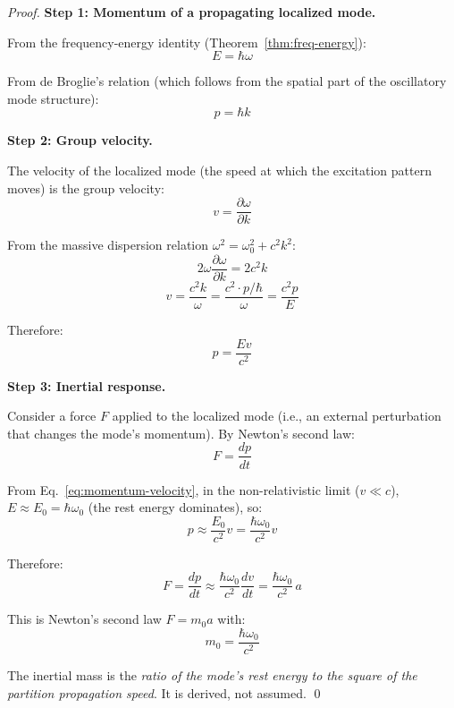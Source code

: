 \begin{proof}
\textbf{Step 1: Momentum of a propagating localized mode.}

From the frequency-energy identity (Theorem~\ref{thm:freq-energy}):
\begin{equation}
    E = \hbar\omega
\end{equation}

From de Broglie's relation (which follows from the spatial part of the oscillatory mode structure):
\begin{equation}
    p = \hbar k
\end{equation}

\textbf{Step 2: Group velocity.}

The velocity of the localized mode (the speed at which the excitation pattern moves) is the group velocity:
\begin{equation}
    v = \frac{\partial \omega}{\partial k}
\end{equation}

From the massive dispersion relation $\omega^2 = \omega_0^2 + c^2 k^2$:
\begin{equation}
    2\omega \frac{\partial \omega}{\partial k} = 2c^2 k
\end{equation}
\begin{equation}
    v = \frac{c^2 k}{\omega} = \frac{c^2 \cdot p/\hbar}{\omega} = \frac{c^2 p}{E}
    \label{eq:group-velocity}
\end{equation}

Therefore:
\begin{equation}
    p = \frac{Ev}{c^2}
    \label{eq:momentum-velocity}
\end{equation}

\textbf{Step 3: Inertial response.}

Consider a force $F$ applied to the localized mode (i.e., an external perturbation that changes the mode's momentum). By Newton's second law:
\begin{equation}
    F = \frac{dp}{dt}
\end{equation}

From Eq.~\eqref{eq:momentum-velocity}, in the non-relativistic limit ($v \ll c$), $E \approx E_0 = \hbar\omega_0$ (the rest energy dominates), so:
\begin{equation}
    p \approx \frac{E_0}{c^2} v = \frac{\hbar\omega_0}{c^2} v
\end{equation}

Therefore:
\begin{equation}
    F = \frac{dp}{dt} \approx \frac{\hbar\omega_0}{c^2} \frac{dv}{dt} = \frac{\hbar\omega_0}{c^2} \, a
\end{equation}

This is Newton's second law $F = m_0 a$ with:
\begin{equation}
    \boxed{m_0 = \frac{\hbar\omega_0}{c^2}}
    \label{eq:mass-derived}
\end{equation}

The inertial mass is the \textit{ratio of the mode's rest energy to the square of the partition propagation speed}. It is derived, not assumed. \qed
\end{proof}

